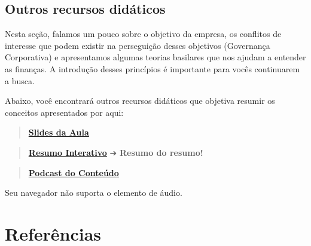 \documentclass[
  a4paper,
]{book}
\begin{document}
\section*{Outros recursos
didáticos}\label{outros-recursos-diduxe1ticos-3}


Nesta seção, falamos um pouco sobre o objetivo da empresa, os conflitos
de interesse que podem existir na perseguição desses objetivos
(Governança Corporativa) e apresentamos algumas teorias basilares que
nos ajudam a entender as finanças. A introdução desses princípios é
importante para vocês continuarem a busca.

Abaixo, você encontrará outros recursos didáticos que objetiva resumir
os conceitos apresentados por aqui:

\begin{quote}
\href{./resources/teorias-ppt.html}{\textbf{Slides da Aula}}
\end{quote}

\begin{quote}
\href{./resources/teorias-interativo.html}{\textbf{Resumo Interativo}} ➔
\textbf{Resumo do resumo!} 🥱
\end{quote}

\begin{quote}
\href{resources/teoria-podcast.mp3}{\textbf{Podcast do Conteúdo}}
\end{quote}

Seu navegador não suporta o elemento de áudio.


\chapter*{Referências}\label{referuxeancias}

\end{document}
